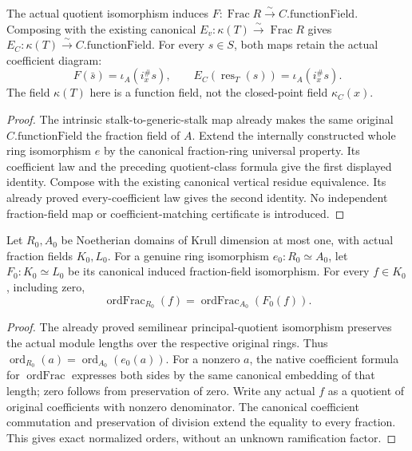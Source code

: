 \begin{definition}
\label{def:central-curve-original-leading-field}
\leanok
The actual quotient isomorphism induces
\(F:\operatorname{Frac}R\xrightarrow{\sim}C.\mathrm{functionField}\).
Composing with the existing canonical
\(E_v:\kappa(T)\xrightarrow{\sim}\operatorname{Frac}R\) gives
\(E_C:\kappa(T)\xrightarrow{\sim}C.\mathrm{functionField}\).
For every \(s\in S\), both maps retain the actual coefficient diagram:
\[
 F(\bar s)=\iota_A(i_x^\#s),\qquad
 E_C(\operatorname{res}_T(s))=\iota_A(i_x^\#s).
\]
The field \(\kappa(T)\) here is a function field, not the closed-point field
\(\kappa_C(x)\).
\end{definition}
\begin{proof}
The intrinsic stalk-to-generic-stalk map already makes the same original
\(C.\mathrm{functionField}\) the fraction field of \(A\).
Extend the internally constructed whole ring isomorphism \(e\) by the
canonical fraction-ring universal property. Its coefficient law and the
preceding quotient-class formula give the first displayed identity.
Compose with the existing canonical vertical residue equivalence.
Its already proved every-coefficient law gives the second identity.
No independent fraction-field map or coefficient-matching certificate is
introduced.
\end{proof}

\begin{lemma}
\label{lem:central-curve-fraction-order-ring-equiv}
\leanok
Let \(R_0,A_0\) be Noetherian domains of Krull dimension at most one,
with actual fraction fields \(K_0,L_0\).
For a genuine ring isomorphism \(e_0:R_0\simeq A_0\), let \(F_0:K_0\simeq L_0\)
be its canonical induced fraction-field isomorphism. For every \(f\in K_0\),
including zero,
\[
 \operatorname{ordFrac}_{R_0}(f)
 =\operatorname{ordFrac}_{A_0}(F_0(f)).
\]
\end{lemma}
\begin{proof}
The already proved semilinear principal-quotient isomorphism preserves
the actual module lengths over the respective original rings.
Thus \(\operatorname{ord}_{R_0}(a)=\operatorname{ord}_{A_0}(e_0(a))\).
For a nonzero \(a\), the native coefficient formula for
\(\operatorname{ordFrac}\) expresses both sides by the same canonical
embedding of that length; zero follows from preservation of zero.
Write any actual \(f\) as a quotient of original coefficients with nonzero
denominator. The canonical coefficient commutation and preservation of
division extend the equality to every fraction.
This gives exact normalized orders, without an unknown ramification factor.
\end{proof}

